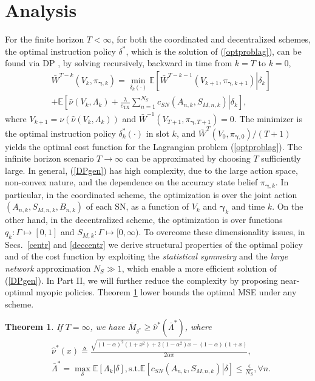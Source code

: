 \documentclass[10pt,twocolumn,twoside]{IEEEtran}
\newtheorem{thm}{Theorem}
\theoremstyle{plain}
\begin{document}
\section{Analysis}
\label{analysis}
\noindent For the finite horizon $T{<}\infty$, for both the coordinated and decentralized schemes, the optimal instruction policy $\delta^*$,
which is the solution of (\ref{optproblag}), can be found
via DP \cite{Bertsekas2005}, by solving recursively, backward in time from $k=T$ to $k=0$,
\begin{align}
\label{DPgen}
&\bar W^{T-k}(V_{k},\pi_{\boldsymbol\gamma,k})
=\min_{\delta_k(\cdot)}
\mathbb E\left[\left.
\bar W^{T-k-1}(V_{k+1},\pi_{\boldsymbol\gamma,k+1})\right|\delta_k\right]\nonumber
\\&
+\mathbb E\left[\left.
\hat \nu(V_{k},\Lambda_k)+
\frac{\lambda}{c_{\mathrm{TX}}}\sum_{n=1}^{N_S}c_{SN}(A_{n,k},S_{M,n,k})\right|\delta_k\right],
\end{align}
where $V_{k+1}{=}\nu(\hat \nu(V_{k},\Lambda_{k}))$ and $\bar W^{-1}(V_{T+1},\pi_{\boldsymbol\gamma,T+1}){=}0$.
The minimizer is the optimal instruction policy $\delta_k^*(\cdot)$ in slot $k$,
and $\bar W^{T}(V_0,\pi_{\boldsymbol\gamma,0})/(T+1)$ yields the optimal cost function for the Lagrangian problem (\ref{optproblag}).
The infinite horizon scenario $T\to\infty$ can be approximated by choosing $T$ sufficiently large.
In general, (\ref{DPgen}) has high complexity, due to the large action space, non-convex nature, and the dependence on the accuracy state belief 
$\pi_{\boldsymbol\gamma,k}$.
In particular, in the coordinated scheme, the optimization is over the joint action $(A_{n,k},S_{M,n,k},B_{n,k})$
of each SN, as a function of $V_k$ and $\boldsymbol{\gamma}_k$ and time $k$.
On the other hand, in the decentralized scheme, the optimization is over functions
$q_k{:}\Gamma{\mapsto}[0,1]$ and $S_{M,k}{:}\Gamma{\mapsto}[0,\infty)$.
To overcome these dimensionality issues,
in Secs.~\ref{centr} and \ref{deccentr} we derive structural properties of the optimal policy and of the cost function by exploiting the \emph{statistical symmetry}
 and the \emph{large network} approximation $N_S{\gg}1$,
which enable a more efficient solution of (\ref{DPgen}). In Part II, we will further reduce the complexity by proposing
 near-optimal myopic policies.
Theorem \ref{lowbound} lower bounds the optimal MSE under any scheme.
\begin{thm}
\label{lowbound}
If $T=\infty$, we have
$\bar M_{\delta^*}\!\!\geq\!\!\hat\nu^*(\bar \Lambda^*)$,
where
\begin{align}
\label{nuing}
&\!\!\hat\nu^*(x)\triangleq\frac{
\sqrt{\!(1\!-\!\alpha)^2(1\!+\!x^2)\!+\!2(1\!\!-\!\!\alpha^2)x}
\!-\!(1\!-\!\alpha)(1\!+\!x)
}
{
2\alpha x
},
\\
\label{maxagg}
&\!\!\!\!\bar\Lambda^*\!\!=\!\max_{\delta}\mathbb E\left[\left.\Lambda_k\right|\delta\right]\!,\text{s.t.}
\mathbb E\left[\left.c_{SN}(A_{n,k},S_{M,n,k})\right|\delta\right]\!\!\leq\!\!\frac{\epsilon}{N_S},\!\forall n.\!\!\!
\end{align}
\end{thm}
\end{document}
